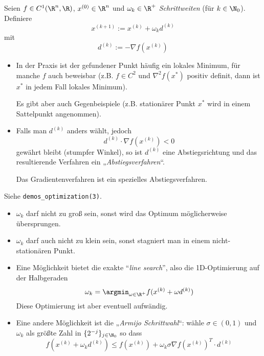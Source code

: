 \documentclass[11pt]{scrbook}
\begin{document}
\begin{df}[Gradientenverfahren] \label{4.6}
	Seien $f \in C^1(\R^n, \R)$, $x^{(0)} \in \R^n$ und $\omega_k \in \R^+$ \emph{Schrittweiten} (für $k \in \N_0$).
	Definiere
	\[
		x^{(k+1)} := x^{(k)} + \omega_k d^{(k)}
	\]
	mit
	\[
		d^{(k)} := - \nabla f(x^{(k)})
	\]
	\begin{note}[Optimalität]
		\begin{itemize}
			\item
				In der Praxis ist der gefundener Punkt häufig ein lokales Minimum, für manche $f$ auch beweisbar (z.B. $f \in C^2$ und $\nabla^2 f(x^*)$ positiv definit, dann ist $x^*$ in jedem Fall lokales Minimum).

				Es gibt aber auch Gegenbeispiele (z.B. stationärer Punkt $x^*$ wird in einem Sattelpunkt angenommen).
		\end{itemize}
	\end{note}
	\begin{note}[Abstiegsrichtung]
		\begin{itemize}
			\item
				Falls man $d^{(k)}$ anders wählt, jedoch
				\[
					d^{(k)} \cdot \nabla f(x^{(k)}) < 0
				\]
				gewährt bleibt (stumpfer Winkel), so ist $d^{(k)}$ eine Abstiegsrichtung und das resultierende Verfahren ein „\emph{Abstiegsverfahren}“.
				
				Das Gradientenverfahren ist ein spezielles Abstiegsverfahren.
		\end{itemize}
	\end{note}
	\begin{note}[Schrittweite]
		Siehe \verb|demos_optimization(3)|.
		\begin{itemize}
			\item
				$\omega_k$ darf nicht zu groß sein, sonst wird das Optimum möglicherweise übersprungen.
			\item
				$\omega_k$ darf auch nicht zu klein sein, sonst stagniert man in einem nicht-stationären Punkt.
			\item
				Eine Möglichkeit bietet die exakte “\emph{line search}”, also die 1D-Optimierung auf der Halbgeraden
				\[
					\omega_k = \argmin_{\omega \in \R^+} f(x^{(k)} + \omega d^{(k)})
				\]
				Diese Optimierung ist aber eventuell aufwändig.
			\item
				Eine andere Möglichkeit ist die „\emph{Armijo Schrittwahl}“: wähle $\sigma \in (0,1)$ und $\omega_k$ als größte Zahl in $\{2^{-j}\}_{j\in \N_0}$ so dass
				\[
					f(x^{(k)} + \omega_k d^{(k)}) \le f(x^{(k)}) + \omega_k \sigma \nabla f(x^{(k)})^T \cdot d^{(k)}
				\]
		\end{itemize}
	\end{note}
\end{df}
\end{document}
